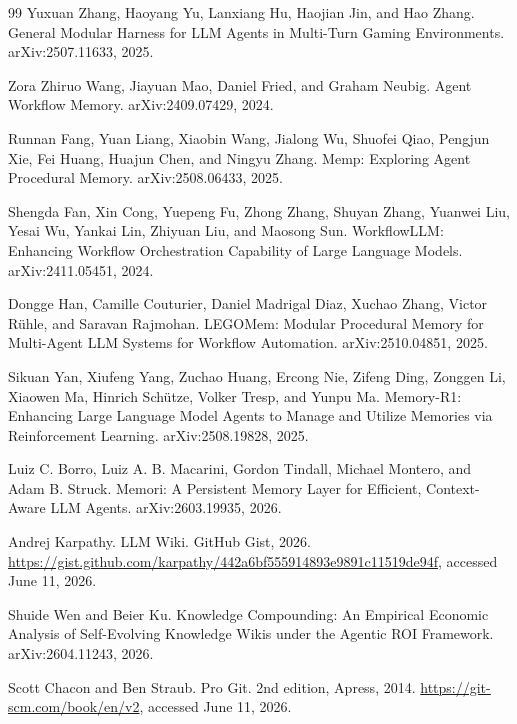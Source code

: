 \documentclass{article}
\begin{document}
\begin{thebibliography}{99}
Yuxuan Zhang, Haoyang Yu, Lanxiang Hu, Haojian Jin, and Hao Zhang.
\newblock General Modular Harness for LLM Agents in Multi-Turn Gaming Environments.
\newblock arXiv:2507.11633, 2025.

Zora Zhiruo Wang, Jiayuan Mao, Daniel Fried, and Graham Neubig.
\newblock Agent Workflow Memory.
\newblock arXiv:2409.07429, 2024.

Runnan Fang, Yuan Liang, Xiaobin Wang, Jialong Wu, Shuofei Qiao, Pengjun Xie, Fei Huang, Huajun Chen, and Ningyu Zhang.
\newblock Memp: Exploring Agent Procedural Memory.
\newblock arXiv:2508.06433, 2025.

Shengda Fan, Xin Cong, Yuepeng Fu, Zhong Zhang, Shuyan Zhang, Yuanwei Liu, Yesai Wu, Yankai Lin, Zhiyuan Liu, and Maosong Sun.
\newblock WorkflowLLM: Enhancing Workflow Orchestration Capability of Large Language Models.
\newblock arXiv:2411.05451, 2024.

Dongge Han, Camille Couturier, Daniel Madrigal Diaz, Xuchao Zhang, Victor R\"uhle, and Saravan Rajmohan.
\newblock LEGOMem: Modular Procedural Memory for Multi-Agent LLM Systems for Workflow Automation.
\newblock arXiv:2510.04851, 2025.

Sikuan Yan, Xiufeng Yang, Zuchao Huang, Ercong Nie, Zifeng Ding, Zonggen Li, Xiaowen Ma, Hinrich Sch\"utze, Volker Tresp, and Yunpu Ma.
\newblock Memory-R1: Enhancing Large Language Model Agents to Manage and Utilize Memories via Reinforcement Learning.
\newblock arXiv:2508.19828, 2025.

Luiz C. Borro, Luiz A. B. Macarini, Gordon Tindall, Michael Montero, and Adam B. Struck.
\newblock Memori: A Persistent Memory Layer for Efficient, Context-Aware LLM Agents.
\newblock arXiv:2603.19935, 2026.

Andrej Karpathy.
\newblock LLM Wiki.
\newblock GitHub Gist, 2026.
\newblock \url{https://gist.github.com/karpathy/442a6bf555914893e9891c11519de94f}, accessed June 11, 2026.

Shuide Wen and Beier Ku.
\newblock Knowledge Compounding: An Empirical Economic Analysis of Self-Evolving Knowledge Wikis under the Agentic ROI Framework.
\newblock arXiv:2604.11243, 2026.

Scott Chacon and Ben Straub.
\newblock Pro Git.
\newblock 2nd edition, Apress, 2014.
\newblock \url{https://git-scm.com/book/en/v2}, accessed June 11, 2026.


\end{thebibliography}
\end{document}
